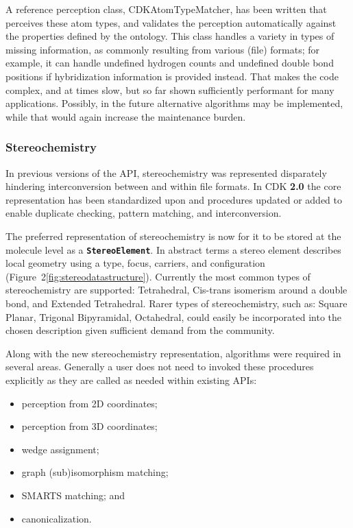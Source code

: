 \documentclass[10pt]{bmcart}
\def \cdkversion {\textbf{2.0}}
\begin{document}
  A reference perception class, CDKAtomTypeMatcher, has been written that perceives these atom types, and
  validates the perception automatically against the properties defined by the ontology.
  This class handles a variety in types of missing information, as commonly resulting
  from various (file) formats; for example, it can handle undefined hydrogen counts
  and undefined double bond positions if hybridization information is provided instead.
  That makes the code complex, and at times slow, but so far shown sufficiently
  performant for many applications. Possibly, in the future
  alternative algorithms may be implemented, while that would again increase the maintenance
  burden.

  \subsubsection*{Stereochemistry}

  In previous versions of the API, stereochemistry was represented disparately hindering 
  interconversion between and within file formats. In CDK \cdkversion{} the core representation 
  has been standardized upon and procedures updated or added to enable duplicate checking,
  pattern matching, and interconversion.

  The preferred representation of stereochemistry is now for it to be stored at the molecule
  level as a \texttt{\textbf{StereoElement}}. In abstract terms a stereo element describes local
  geometry using a type, focus, carriers, and configuration (Figure~2\ref{fig:stereodatastructure}).
  Currently the most common types of stereochemistry are supported: Tetrahedral, Cis-trans isomerism 
  around a double bond, and Extended Tetrahedral. Rarer types of stereochemistry, such as: Square 
  Planar, Trigonal Bipyramidal, Octahedral, could easily be incorporated into the chosen description 
  given sufficient demand from the community.


  Along with the new stereochemistry representation, algorithms were required in several areas. Generally
  a user does not need to invoked these procedures explicitly as they are called as needed within existing
  APIs:

  \begin{itemize}
   \item perception from 2D coordinates;
   \item perception from 3D coordinates;
   \item wedge assignment;
   \item graph (sub)isomorphism matching;
   \item SMARTS matching; and
   \item canonicalization.
  \end{itemize}
\end{document}
